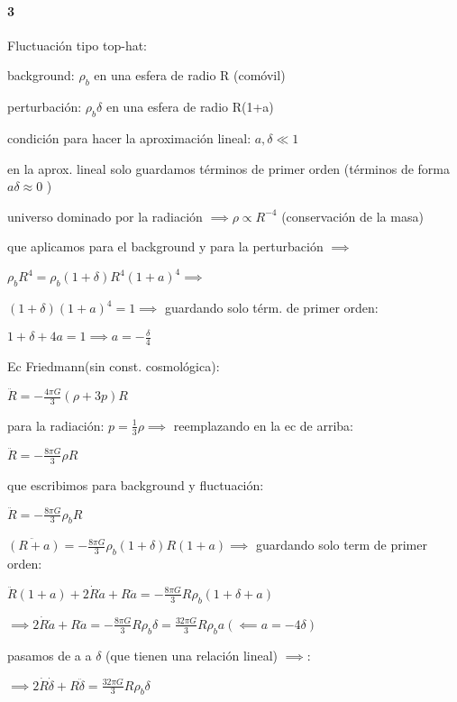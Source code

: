 \documentclass[12pt]{book}
\begin{document}
\paragraph{3}


Fluctuación tipo top-hat:
\begin{description}
\item background: $\rho_b$ en una esfera de radio R (comóvil)
\item perturbación: $\rho_b \delta $ en una esfera de radio R(1+a)
\item condición para  hacer la aproximación lineal: $ a, \delta \ll 1$
\end{description}

en la aprox. lineal solo guardamos  términos de primer orden (términos de forma $a \delta \approx 0$ )

universo dominado por la radiación $\implies \rho \propto R^{-4}$ (conservación de la masa)

que aplicamos para el background y para la perturbación $\implies $

$\rho_b R^4 = \rho_b (1+\delta) R^4 (1+a)^4 \implies $

$(1+\delta)(1+a)^4 = 1 \implies $ guardando solo térm. de primer orden: 


$1 + \delta + 4a = 1 \implies a = -\frac{\delta}{4}$

Ec Friedmann(sin const. cosmológica):

$\ddot{R} = -\frac{4 \pi G}{3} (\rho + 3p) R$

para la radiación: $p = \frac{1}{3} \rho \implies$ reemplazando en la ec de arriba: 

$\ddot{R} = -\frac{8 \pi G}{3} \rho  R$

que escribimos para background y fluctuación:


$\ddot{R} = -\frac{8 \pi G}{3} \rho_b  R$

$\ddot{(R+a)} = -\frac{8 \pi G}{3} \rho_b(1+\delta)  R(1+a) \implies $ guardando solo term de primer orden:


$\ddot{R}(1+a) + 2 \dot{R}\dot{a} + R \ddot{a} =  -\frac{8 \pi G}{3} R  \rho_b(1+\delta + a) $


$\implies 2  \dot{R}\dot{a} + R \ddot{a} =  -\frac{8 \pi G}{3} R  \rho_b \delta = \frac{32 \pi G}{3} R  \rho_b a (\impliedby a = -4\delta)$

pasamos de a a $\delta$ (que tienen una relación lineal) $\implies $: 

$\implies 2  \dot{R}\dot{\delta} + R \ddot{\delta} =  \frac{32 \pi G}{3} R  \rho_b \delta $
\end{document}
